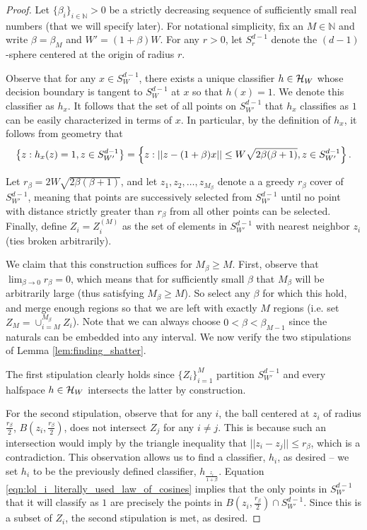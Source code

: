 \begin{proof}
Let $\{\beta_i\}_{i \in \mathbb{N}} > 0$ be a strictly decreasing sequence of sufficiently small real numbers (that we will specify later). For notational simplicity, fix an $M \in \mathbb{N}$ and write $\beta=\beta_M$ and $W' = (1 + \beta)W$. For any $r > 0$, let $S_r^{d-1}$ denote the $(d-1)$-sphere centered at the origin of radius $r$.

Observe that for any $x \in S_W^{d-1}$, there exists a unique classifier $h \in \mathcal H_W$ whose decision boundary is tangent to $S_W^{d-1}$ at $x$ so that $h(x) = 1$. We denote this classifier as $h_x$. It follows that the set of all points on $S_{W'}^{d-1}$ that $h_x$ classifies as $1$ can be easily characterized in terms of $x$. In particular, by the definition of $h_x$, it follows from geometry that
\begin{equation}\label{eqn:lol_i_literally_used_law_of_cosines}
\left\{z: h_x(z) = 1, z \in S_{W'}^{d-1}\right\} = \left\{z: ||z - (1+\beta)x|| \leq W\sqrt{2\beta(\beta + 1)}, z \in S_{W'}^{d-1}\right\}.
\end{equation}

Let $r_\beta = 2W\sqrt{2\beta(\beta + 1)}$, and let $z_1, z_2, \dots, z_{M_{\beta}}$ denote a a greedy $r_\beta$ cover of $S_{W'}^{d-1}$, meaning that points are successively selected from $S_{W'}^{d-1}$ until no point with distance strictly greater than $r_\beta$ from all other points can be selected. Finally, define $Z_i=Z_i^{(M)}$ as the set of elements in $S_{W'}^{d-1}$ with nearest neighbor $z_i$ (ties broken arbitrarily).

We claim that this construction suffices for $M_\beta \geq M$. First, observe that $\lim_{\beta \to 0} r_\beta = 0$, which means that for sufficiently small $\beta$ that $M_\beta$ will be arbitrarily large (thus satisfying $M_\beta \geq M$). So select any $\beta$ for which this hold, and merge enough regions so that we are left with exactly $M$ regions (i.e. set $Z_{M} = \cup_{i = M}^{M_\beta} Z_i$). Note that we can always choose $0<\beta< \beta_{M-1}$ since the naturals can be embedded into any interval. We now verify the two stipulations of Lemma \ref{lem:finding_shatter}. 

The first stipulation clearly holds since $\{Z_i\}_{i=1}^M$ partition $S_{W'}^{d-1}$ and every halfspace $h \in \mathcal H_W$ intersects the latter by construction.

For the second stipulation, observe that for any $i$, the ball centered at $z_i$ of radius $\frac{r_\beta}{2}$, $B\left(z_i, \frac{r_\beta}{2}\right)$, does not intersect $Z_j$ for any $i \neq j$. This is because such an intersection would imply by the triangle inequality that $||z_i - z_j|| \leq r_\beta$, which is a contradiction. This observation allows us to find a classifier, $h_i$, as desired --  we set $h_i$ to be the previously defined classifier, $h_{\frac{z_i}{1 + \beta}}$. Equation \ref{eqn:lol_i_literally_used_law_of_cosines} implies that the only points in $S_{W'}^{d-1}$ that it will classify as $1$ are precisely the points in $B\left(z_i, \frac{r_\beta}{2}\right) \cap S_{W'}^{d-1}$. Since this is a subset of $Z_i$, the second stipulation is met, as desired.


\end{proof}
